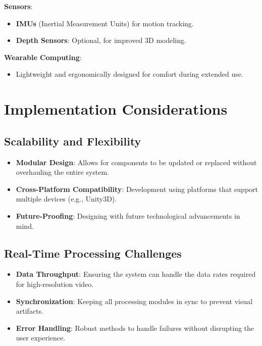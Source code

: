 \documentclass{article}
\begin{document}
\textbf{Sensors}:
\begin{itemize}
    \item \textbf{IMUs} (Inertial Measurement Units) for motion tracking.
    \item \textbf{Depth Sensors}: Optional, for improved 3D modeling.
\end{itemize}

\textbf{Wearable Computing}:
\begin{itemize}
    \item Lightweight and ergonomically designed for comfort during extended use.
\end{itemize}

\section{Implementation Considerations}

\subsection{Scalability and Flexibility}

\begin{itemize}
    \item \textbf{Modular Design}: Allows for components to be updated or replaced without overhauling the entire system.
    \item \textbf{Cross-Platform Compatibility}: Development using platforms that support multiple devices (e.g., Unity3D).
    \item \textbf{Future-Proofing}: Designing with future technological advancements in mind.
\end{itemize}

\subsection{Real-Time Processing Challenges}

\begin{itemize}
    \item \textbf{Data Throughput}: Ensuring the system can handle the data rates required for high-resolution video.
    \item \textbf{Synchronization}: Keeping all processing modules in sync to prevent visual artifacts.
    \item \textbf{Error Handling}: Robust methods to handle failures without disrupting the user experience.
\end{itemize}
\end{document}
